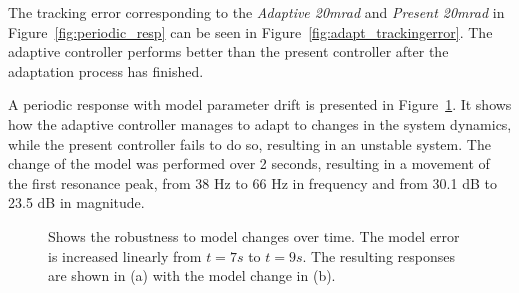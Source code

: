 The tracking error corresponding to the \emph{Adaptive 20mrad} and \emph{Present 20mrad} in Figure~\ref{fig:periodic_resp} can be seen in Figure~\ref{fig:adapt_trackingerror}. The adaptive controller performs better than the present controller after the adaptation process has finished.

A periodic response with model parameter drift is presented in Figure~\ref{fig:modeldrift}. It shows how the adaptive controller manages to adapt to changes in the system dynamics, while the present controller fails to do so, resulting in an unstable system. The change of the model was performed over 2 seconds, resulting in a movement of the first resonance peak, from 38 Hz to 66 Hz in frequency and from 30.1 dB to 23.5 dB in magnitude.
\begin{figure}[h!]
  \centering %
  \qquad
  \caption{\label{fig:modeldrift} Shows the robustness to model changes over time. The model error is increased linearly from $t=7s$ to $t=9s$. The resulting responses are shown in (a) with the model change in (b).}
\end{figure}

